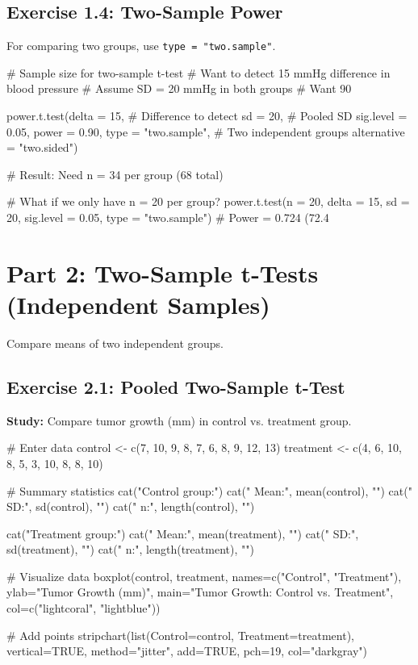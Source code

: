 \documentclass[11pt]{article}
\begin{document}
\vspace{1.5cm}

\subsection{Exercise 1.4: Two-Sample Power}

For comparing two groups, use \texttt{type = "two.sample"}.

\begin{rcode}
# Sample size for two-sample t-test
# Want to detect 15 mmHg difference in blood pressure
# Assume SD = 20 mmHg in both groups
# Want 90%

power.t.test(delta = 15,          # Difference to detect
             sd = 20,              # Pooled SD
             sig.level = 0.05,
             power = 0.90,
             type = "two.sample",  # Two independent groups
             alternative = "two.sided")

# Result: Need n = 34 per group (68 total)

# What if we only have n = 20 per group?
power.t.test(n = 20, delta = 15, sd = 20,
             sig.level = 0.05, type = "two.sample")
# Power = 0.724 (72.4%
\end{rcode}

\section{Part 2: Two-Sample t-Tests (Independent Samples)}

Compare means of two independent groups.

\subsection{Exercise 2.1: Pooled Two-Sample t-Test}

\textbf{Study:} Compare tumor growth (mm) in control vs. treatment group.

\begin{rcode}
# Enter data
control <- c(7, 10, 9, 8, 7, 6, 8, 9, 12, 13)
treatment <- c(4, 6, 10, 8, 5, 3, 10, 8, 8, 10)

# Summary statistics
cat("Control group:\n")
cat("  Mean:", mean(control), "\n")
cat("  SD:", sd(control), "\n")
cat("  n:", length(control), "\n\n")

cat("Treatment group:\n")
cat("  Mean:", mean(treatment), "\n")
cat("  SD:", sd(treatment), "\n")
cat("  n:", length(treatment), "\n\n")

# Visualize data
boxplot(control, treatment,
        names=c("Control", "Treatment"),
        ylab="Tumor Growth (mm)",
        main="Tumor Growth: Control vs. Treatment",
        col=c("lightcoral", "lightblue"))

# Add points
stripchart(list(Control=control, Treatment=treatment),
           vertical=TRUE, method="jitter", add=TRUE,
           pch=19, col="darkgray")
\end{rcode}
\end{document}
